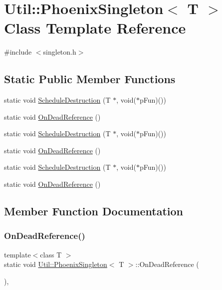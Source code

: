 \hypertarget{classUtil_1_1PhoenixSingleton}{}\section{Util\+:\+:Phoenix\+Singleton$<$ T $>$ Class Template Reference}
\label{classUtil_1_1PhoenixSingleton}


{\ttfamily \#include $<$singleton.\+h$>$}

\subsection*{Static Public Member Functions}
\begin{DoxyCompactItemize}
\item 
static void \mbox{\hyperlink{classUtil_1_1PhoenixSingleton_ae72674e7906650e2377455c5a54af2fa}{Schedule\+Destruction}} (T $\ast$, void($\ast$p\+Fun)())
\item 
static void \mbox{\hyperlink{classUtil_1_1PhoenixSingleton_a6413ee75c9bf2023b4e49dc4a7d21328}{On\+Dead\+Reference}} ()
\item 
static void \mbox{\hyperlink{classUtil_1_1PhoenixSingleton_ae72674e7906650e2377455c5a54af2fa}{Schedule\+Destruction}} (T $\ast$, void($\ast$p\+Fun)())
\item 
static void \mbox{\hyperlink{classUtil_1_1PhoenixSingleton_a6413ee75c9bf2023b4e49dc4a7d21328}{On\+Dead\+Reference}} ()
\item 
static void \mbox{\hyperlink{classUtil_1_1PhoenixSingleton_ae72674e7906650e2377455c5a54af2fa}{Schedule\+Destruction}} (T $\ast$, void($\ast$p\+Fun)())
\item 
static void \mbox{\hyperlink{classUtil_1_1PhoenixSingleton_a6413ee75c9bf2023b4e49dc4a7d21328}{On\+Dead\+Reference}} ()
\end{DoxyCompactItemize}


\subsection{Member Function Documentation}
\mbox{\label{classUtil_1_1PhoenixSingleton_a6413ee75c9bf2023b4e49dc4a7d21328}} 
\subsubsection{\texorpdfstring{OnDeadReference()}{OnDeadReference()}\hspace{0.1cm}{\footnotesize\ttfamily [1/3]}}
{\footnotesize\ttfamily template$<$class T $>$ \\
static void \mbox{\hyperlink{classUtil_1_1PhoenixSingleton}{Util\+::\+Phoenix\+Singleton}}$<$ T $>$\+::On\+Dead\+Reference (\begin{DoxyParamCaption}{ }\end{DoxyParamCaption})\hspace{0.3cm}{\ttfamily [inline]}, {\ttfamily [static]}}

